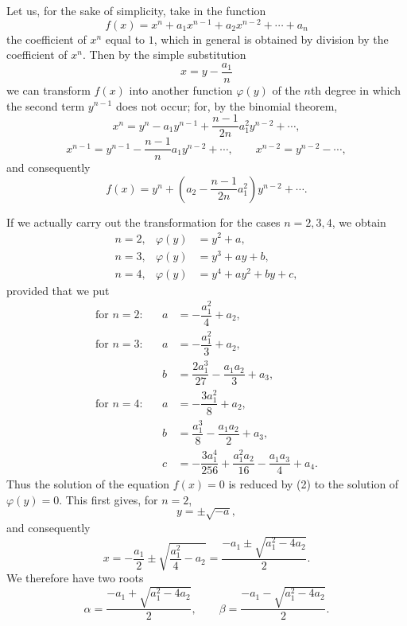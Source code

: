 \documentclass[11pt]{article}
\begin{document}
Let us, for the sake of simplicity, take in the function
\begin{equation}
f(x)=x^n+a_1x^{n-1}+a_2x^{n-2}+\cdots+a_n
\tag{1}
\end{equation}
the coefficient of $x^n$ equal to $1$, which in general is obtained by division by the coefficient of $x^n$. Then by the simple substitution
\begin{equation}
x=y-\frac{a_1}{n}
\tag{2}
\end{equation}
we can transform $f(x)$ into another function $\varphi(y)$ of the $n$th degree in which the second term $y^{n-1}$ does not occur; for, by the binomial theorem,
\[
 x^n=y^n-a_1y^{n-1}+\frac{n-1}{2n}a_1^2y^{n-2}+\cdots,
\]
\[
 x^{n-1}=y^{n-1}-\frac{n-1}{n}a_1y^{n-2}+\cdots,
 \qquad x^{n-2}=y^{n-2}-\cdots,
\]
and consequently
\[
 f(x)=y^n+\left(a_2-\frac{n-1}{2n}a_1^2\right)y^{n-2}+\cdots .
\]

If we actually carry out the transformation for the cases $n=2,3,4$, we obtain
\begin{equation}
\begin{array}{rcl}
n=2, & \varphi(y)&=y^2+a,\\[0.25em]
n=3, & \varphi(y)&=y^3+ay+b,\\[0.25em]
n=4, & \varphi(y)&=y^4+ay^2+by+c,
\end{array}
\tag{3}
\end{equation}
provided that we put
\begin{equation}
\begin{array}{rcll}
\text{for }n=2:&& a&=-\dfrac{a_1^2}{4}+a_2,\\[0.75em]
\text{for }n=3:&& a&=-\dfrac{a_1^2}{3}+a_2,\\[0.75em]
&& b&=\dfrac{2a_1^3}{27}-\dfrac{a_1a_2}{3}+a_3,\\[0.75em]
\text{for }n=4:&& a&=-\dfrac{3a_1^2}{8}+a_2,\\[0.75em]
&& b&=\dfrac{a_1^3}{8}-\dfrac{a_1a_2}{2}+a_3,\\[0.75em]
&& c&=-\dfrac{3a_1^4}{256}+\dfrac{a_1^2a_2}{16}-\dfrac{a_1a_3}{4}+a_4.
\end{array}
\tag{4}
\end{equation}
Thus the solution of the equation $f(x)=0$ is reduced by (2) to the solution of $\varphi(y)=0$. This first gives, for $n=2$,
\[
 y=\pm\sqrt{-a},
\]
and consequently
\[
 x=-\frac{a_1}{2}\pm\sqrt{\frac{a_1^2}{4}-a_2}
   =\frac{-a_1\pm\sqrt{a_1^2-4a_2}}{2}.
\]
We therefore have two roots
\begin{equation}
\alpha=\frac{-a_1+\sqrt{a_1^2-4a_2}}{2},\qquad
\beta =\frac{-a_1-\sqrt{a_1^2-4a_2}}{2}.
\tag{5}
\end{equation}
\end{document}
